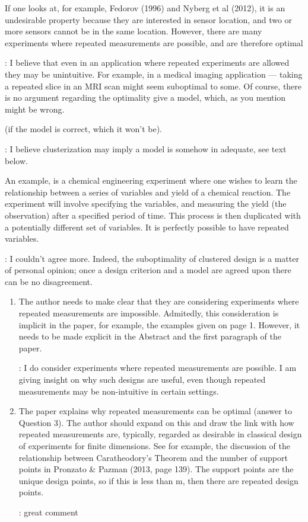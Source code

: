 \documentclass{amsart}
\begin{document}
If one looks at, for example, Fedorov (1996) and Nyberg et
al (2012), it is an undesirable property because they are interested
in sensor location, and two or more sensors cannot be in the same
location. However, there are many experiments where repeated
measurements are possible, and are therefore optimal

\answer: I believe that even in an application where repeated
experiments are allowed they may be unintuitive. For example, in a
medical imaging application --- taking a repeated slice in an MRI scan
might seem suboptimal to some. Of course, there is no argument
regarding the optimality give a model, which, as you mention might be
wrong.


(if the model is correct, which it won’t be).

\answer: I believe clusterization may imply a model is somehow in
adequate, see text below.


An example, is a chemical engineering experiment
where one wishes to learn the relationship between a series of
variables and yield of a chemical reaction. The experiment will
involve specifying the variables, and measuring the yield (the
observation) after a specified period of time. This process is then
duplicated with a potentially different set of variables.  It is
perfectly possible to have repeated variables.

\answer: I couldn't agree more. Indeed, the suboptimality of clustered
design is a matter of personal opinion; once a design criterion and a
model are agreed upon there can be no disagreement.

\begin{enumerate}
 
\item The author needs to make clear that they are considering
  experiments where repeated measurements are impossible. Admitedly,
  this consideration is implicit in the paper, for example, the
  examples given on page 1. However, it needs to be made explicit in
  the Abstract and the first paragraph of the paper.

  \answer: I do consider experiments where repeated measurements are
  possible. I am giving insight on why such designs are useful, even
  though repeated measurements may be non-intuitive in certain
  settings.
  
\item The paper explains why repeated measurements can be optimal
  (answer to Question 3). The author should expand on this and draw
  the link with how repeated measurements are, typically, regarded as
  desirable in classical design of experiments for finite
  dimensions. See for example, the discussion of the relationship
  between Caratheodory’s Theorem and the number of support points in
  Pronzato \& Pazman (2013, page 139). The support points are the
  unique design points, so if this is less than m, then there are
  repeated design points.

  \answer: great comment
\end{enumerate}
\end{document}
